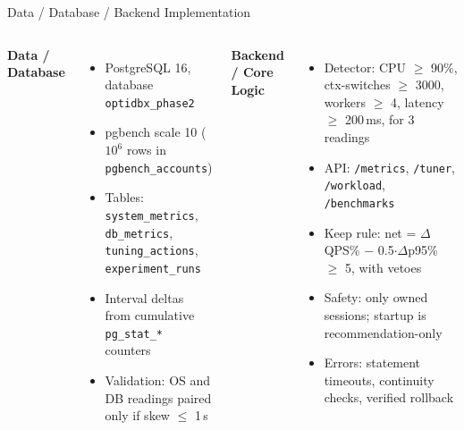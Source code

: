 \documentclass[aspectratio=169,11pt]{beamer}
\begin{document}
\begin{frame}{Data / Database / Backend Implementation}

\begin{columns}[T,totalwidth=\textwidth]


\textbf{\color{GEUBlue}Data / Database}

\begin{itemize}\itemsep2pt\small
    \item PostgreSQL 16, database \texttt{optidbx\_phase2}
    \item pgbench scale 10 ($10^6$ rows in \texttt{pgbench\_accounts})
    \item Tables: \texttt{system\_metrics}, \texttt{db\_metrics},
          \texttt{tuning\_actions}, \texttt{experiment\_runs}
    \item Interval deltas from cumulative \texttt{pg\_stat\_*} counters
    \item Validation: OS and DB readings paired only if skew $\le$ 1\,s
\end{itemize}


\textbf{\color{GEUBlue}Backend / Core Logic}

\begin{itemize}\itemsep2pt\small
    \item Detector: CPU $\ge$ 90\%, ctx-switches $\ge$ 3000, workers $\ge$ 4,
          latency $\ge$ 200\,ms, for 3 readings
    \item API: \texttt{/metrics}, \texttt{/tuner}, \texttt{/workload}, \texttt{/benchmarks}
    \item Keep rule: net = $\Delta$QPS\% $-$ 0.5$\cdot\Delta$p95\% $\ge$ 5, with vetoes
    \item Safety: only owned sessions; startup is recommendation-only
    \item Errors: statement timeouts, continuity checks, verified rollback
\end{itemize}

\end{columns}

\end{frame}
\end{document}

